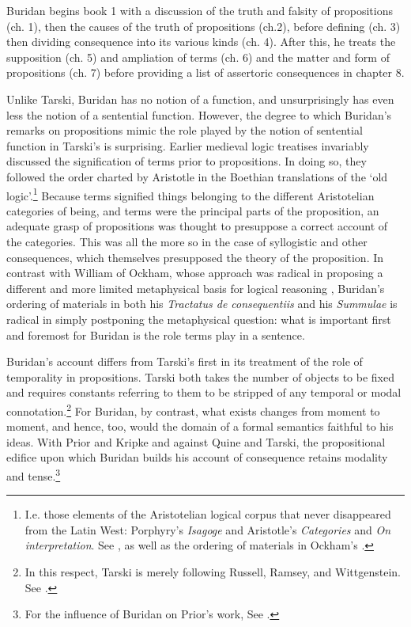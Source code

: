 \documentclass[]{article}
\begin{document}
Buridan begins book 1 with a discussion of the truth and falsity of propositions (ch. 1), then the causes of the truth of propositions (ch.2), before defining (ch. 3) then dividing consequence into its various kinds (ch. 4). After this, he treats the supposition (ch. 5) and ampliation of terms (ch. 6) and the matter and form of propositions (ch. 7) before providing a list of assertoric consequences in chapter 8.

Unlike Tarski, Buridan has no notion of a function, and unsurprisingly has even less the notion of a sentential function. However, the degree to which Buridan's remarks on propositions mimic the role played by the notion of sentential function in Tarski's is surprising. Earlier medieval logic treatises invariably discussed the signification of terms prior to propositions. In doing so, they followed the order charted by Aristotle in the Boethian translations of the `old logic'.\footnote{I.e. those elements of the Aristotelian logical corpus that never disappeared from the Latin West: Porphyry's \textit{Isagoge} and Aristotle's \textit{Categories} and \textit{On interpretation}. See \cite[in peri herm., prol.]{AquinasDI}, as well as the ordering of materials in Ockham's \cite{OckhamSLI}.} Because terms signified things belonging to the different Aristotelian categories of being, and terms were the principal parts of the proposition, an adequate grasp of propositions was thought to presuppose a correct account of the categories. This was all the more so in the case of syllogistic and other consequences, which themselves presupposed the theory of the proposition. In contrast with William of Ockham, whose approach was radical in proposing a different and more limited metaphysical basis for logical reasoning \cite{Read2007}, Buridan's ordering of materials in both his \textit{Tractatus de consequentiis} and his \textit{Summulae} is radical in simply postponing the metaphysical question: what is important first and foremost for Buridan is the role terms play in a sentence.

Buridan's account differs from Tarski's first in its treatment of the role of temporality in propositions. Tarski both takes the number of objects to be fixed and requires constants referring to them to be stripped of any temporal or modal connotation.\footnote{In this respect, Tarski is merely following Russell, Ramsey, and Wittgenstein. See \cite[p. 59ff]{Ramsey1931}.} For Buridan, by contrast, what exists changes from moment to moment, and hence, too, would the domain of a formal semantics faithful to his ideas. With Prior and Kripke and against Quine and Tarski, the propositional edifice upon which Buridan builds his account of consequence retains modality and tense.\footnote{For the influence of Buridan on Prior's work, See \cite{Uckelman2012b}.}
\end{document}
